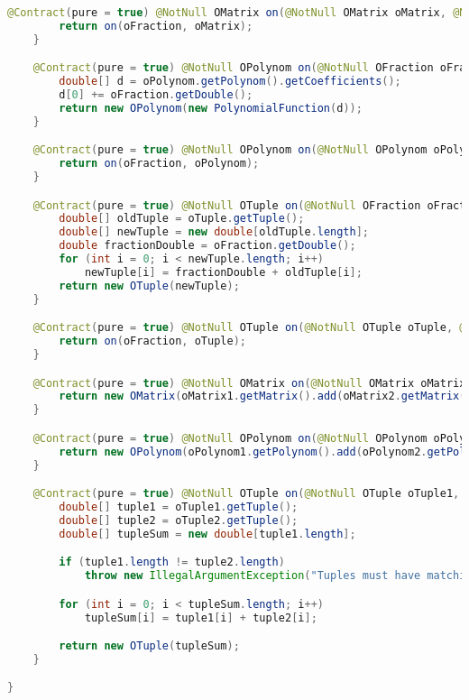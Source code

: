 \begin{lstlisting}[caption=Plus (Falk),label=list:Plus,language=Java]
    @Contract(pure = true) @NotNull OMatrix on(@NotNull OMatrix oMatrix, @NotNull OFraction oFraction) {
        return on(oFraction, oMatrix);
    }

    @Contract(pure = true) @NotNull OPolynom on(@NotNull OFraction oFraction, @NotNull OPolynom oPolynom) {
        double[] d = oPolynom.getPolynom().getCoefficients();
        d[0] += oFraction.getDouble();
        return new OPolynom(new PolynomialFunction(d));
    }

    @Contract(pure = true) @NotNull OPolynom on(@NotNull OPolynom oPolynom, @NotNull OFraction oFraction) {
        return on(oFraction, oPolynom);
    }

    @Contract(pure = true) @NotNull OTuple on(@NotNull OFraction oFraction, @NotNull OTuple oTuple) {
        double[] oldTuple = oTuple.getTuple();
        double[] newTuple = new double[oldTuple.length];
        double fractionDouble = oFraction.getDouble();
        for (int i = 0; i < newTuple.length; i++)
            newTuple[i] = fractionDouble + oldTuple[i];
        return new OTuple(newTuple);
    }

    @Contract(pure = true) @NotNull OTuple on(@NotNull OTuple oTuple, @NotNull OFraction oFraction) {
        return on(oFraction, oTuple);
    }

    @Contract(pure = true) @NotNull OMatrix on(@NotNull OMatrix oMatrix1, @NotNull OMatrix oMatrix2) {
        return new OMatrix(oMatrix1.getMatrix().add(oMatrix2.getMatrix()));
    }

    @Contract(pure = true) @NotNull OPolynom on(@NotNull OPolynom oPolynom1, @NotNull OPolynom oPolynom2) {
        return new OPolynom(oPolynom1.getPolynom().add(oPolynom2.getPolynom()));
    }

    @Contract(pure = true) @NotNull OTuple on(@NotNull OTuple oTuple1, @NotNull OTuple oTuple2) {
        double[] tuple1 = oTuple1.getTuple();
        double[] tuple2 = oTuple2.getTuple();
        double[] tupleSum = new double[tuple1.length];

        if (tuple1.length != tuple2.length)
            throw new IllegalArgumentException("Tuples must have matching size.");

        for (int i = 0; i < tupleSum.length; i++)
            tupleSum[i] = tuple1[i] + tuple2[i];

        return new OTuple(tupleSum);
    }

}
\end{lstlisting}    

